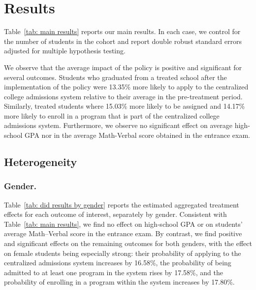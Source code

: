 \documentclass[11pt]{article}
\begin{document}




\section{Results}\label{sec:results}

Table~\ref{tab: main results} reports our main results. In each case, we control for the number of students in the cohort and report double robust standard errors adjusted for multiple hypothesis testing. 



We observe that the average impact of the policy is positive and significant for several outcomes. Students who graduated from a treated school after the implementation of the policy were 13.35\% more likely to apply to the centralized college admissions system relative to their average in the pre-treatment period. Similarly, treated students where 15.03\% more likely to be assigned and 14.17\% more likely to enroll in a program that is part of the centralized college admissions system. Furthermore, we observe no significant effect on average high-school GPA nor in the average Math-Verbal score obtained in the entrance exam.

\subsection{Heterogeneity}

\subsubsection{Gender.} Table~\ref{tab: did results by gender} reports the estimated aggregated treatment effects for each outcome of interest, separately by gender. Consistent with Table~\ref{tab: main results}, we find no effect on high‑school GPA or on students' average Math–Verbal score in the entrance exam. By contrast, we find positive and significant effects on the remaining outcomes for both genders, with the effect on female students being especially strong: their probability of applying to the centralized admissions system increases by 16.58\%, the probability of being admitted to at least one program in the system rises by 17.58\%, and the probability of enrolling in a program within the system increases by 17.80\%.
\end{document}
